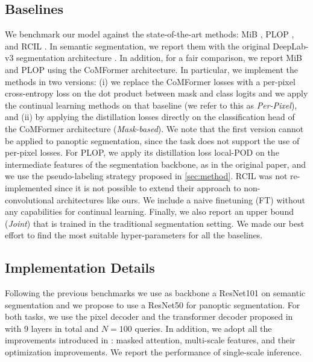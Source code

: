 \documentclass[10pt,twocolumn,letterpaper]{article}
\begin{document}
\subsection{Baselines} \label{sec:baselines}
We benchmark our model against the state-of-the-art methods: MiB \cite{cermelli2020modelingthebackground}, PLOP \cite{douillard2020plop}, and RCIL \cite{zhang2022rcil}. In semantic segmentation, we report them with the original DeepLab-v3 segmentation architecture \cite{chen2017deeplabv3}. In addition, for a fair comparison, we report MiB and PLOP using the CoMFormer architecture. In particular, we implement the methods in two versions: (i) we replace the CoMFormer losses with a per-pixel cross-entropy loss on the dot product between mask and class logits and we apply the continual learning methods on that baseline (we refer to this as \textit{Per-Pixel}), and (ii) by applying the distillation losses directly on the classification head of the CoMFormer architecture (\textit{Mask-based}). We note that the first version cannot be applied to panoptic segmentation, since the task does not support the use of per-pixel losses. For PLOP, we apply its distillation loss local-POD on the intermediate features of the segmentation backbone, as in the original paper, and we use the pseudo-labeling strategy proposed in \cref{sec:method}. RCIL was not re-implemented since it is not possible to extend their approach to non-convolutional architectures like ours. We include a naive finetuning (FT) without any capabilities for continual learning. 
Finally, we also report an upper bound (\textit{Joint}) that is trained in the traditional segmentation setting. We made our best effort to find the most suitable hyper-parameters for all the baselines. 

\subsection{Implementation Details}
\vspace{-1em} Following the previous benchmarks \cite{cermelli2020modelingthebackground, douillard2020plop} we use as backbone a ResNet101 \cite{he2016resnet} on semantic segmentation and we propose to use a ResNet50 \cite{he2016resnet} for panoptic segmentation. For both tasks, we use the pixel decoder and the transformer decoder proposed in \cite{cheng2021masked} with 9 layers in total and $N=100$ queries. In addition, we adopt all the improvements introduced in \cite{cheng2021masked}: masked attention, multi-scale features, and their optimization improvements. 
We report the performance of single-scale inference.
\end{document}
